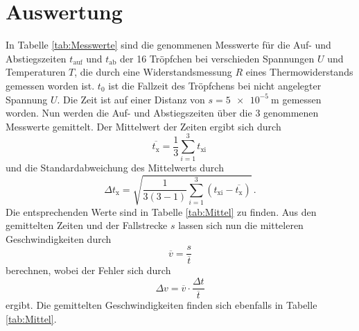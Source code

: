 \section{Auswertung}
In Tabelle \ref{tab:Messwerte} sind die genommenen Messwerte für die Auf- und Abstiegszeiten
$t_{\text{auf}}$ und $t_{\text{ab}}$ der 16 Tröpfchen bei verschieden Spannungen $U$ und Temperaturen $T$,
die durch eine Widerstandsmessung $R$ eines Thermowiderstands gemessen worden ist. $t_0$ ist die
Fallzeit des Tröpfchens bei nicht angelegter Spannung $U$. Die Zeit ist auf einer Distanz von $s=\qty{5e-5}{\meter}$
gemessen worden. Nun werden die Auf- und Abstiegszeiten über die 3 genommenen Messwerte gemittelt. Der Mittelwert der Zeiten ergibt sich durch
\begin{equation}\label{eq:mean}
    \overline{t_\text{x}}=\frac{1}{3}\sum_{i=1}^3t_\text{xi}\,
\end{equation}
und die Standardabweichung des Mittelwerts durch
\begin{equation}\label{eq:std}
    \Delta{t_\text{x}}=\sqrt{\frac{1}{3(3-1)}\sum_{i=1}^3\left(t_\text{xi}-\overline{t_\text{x}}\right)}\,.
\end{equation}
Die entsprechenden Werte sind in Tabelle \ref{tab:Mittel} zu finden.
Aus den gemittelten Zeiten und der Fallstrecke $s$ lassen sich nun die mitteleren Geschwindigkeiten
durch 
\begin{equation}\label{eq:v}
    \overline{v}=\frac{s}{\overline{t}}
\end{equation}
berechnen, wobei der Fehler sich durch 
\begin{equation}\label{eq:dv}
    \Delta{v}=\overline{v}\cdot \frac{\Delta t}{\overline{t}}
\end{equation}
ergibt. Die gemittelten Geschwindigkeiten finden sich ebenfalls in Tabelle \ref{tab:Mittel}. 
\label{sec:Auswertung}
